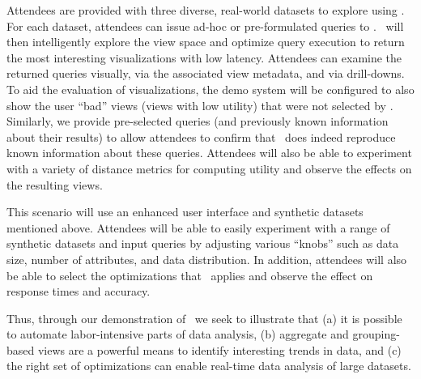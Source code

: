  Attendees are provided with three
diverse, real-world datasets to explore using \SeeDB. For each dataset,
attendees can issue ad-hoc or pre-formulated queries to \SeeDB. \SeeDB\ will
then intelligently explore the view space and optimize query execution to return the
most interesting visualizations with low latency. Attendees can examine the
returned queries visually, via the associated view metadata, and via
drill-downs. To aid the evaluation of visualizations, the demo system will 
be configured to also show the user ``bad'' views (views with low utility) that were not selected
by \SeeDB.
Similarly, we provide pre-selected queries (and
previously known information about their results) to allow attendees to
confirm that \SeeDB\ does indeed reproduce known information about these
queries. Attendees will also be able to experiment with a
variety of distance metrics for computing utility and observe the effects on the
resulting views.


 This scenario
will use an enhanced user interface and synthetic datasets mentioned above.
Attendees will be able to easily experiment with a range of synthetic datasets and input
queries by adjusting various ``knobs'' such as data size, number of attributes, and
data distribution. In addition, attendees will also be able to select the
optimizations that \SeeDB\ applies and observe the effect on response times and
accuracy.

Thus, through our demonstration of \SeeDB\, we seek to illustrate that (a) it is
possible to automate labor-intensive parts of data analysis, (b) aggregate
and grouping-based views are a powerful means to identify interesting trends
in data, and (c) the right set of optimizations can enable real-time data
analysis of large datasets.